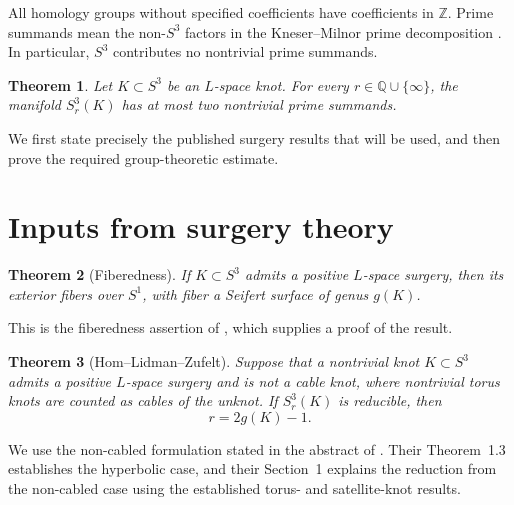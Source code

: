 \documentclass[11pt]{article}
\newcommand{\Z}{\mathbb{Z}}
\newcommand{\surg}[2]{S^3_{#1}(#2)}
\newtheorem{theorem}{Theorem}
\begin{document}
All homology groups without specified coefficients have coefficients
in \(\Z\). Prime summands mean the non-\(S^3\) factors in the
Kneser--Milnor prime decomposition
\cite[Theorem~1]{Milnor}. In particular, \(S^3\) contributes no
nontrivial prime summands.

\begin{theorem}\label{thm:main}
Let \(K\subset S^3\) be an \(L\)-space knot. For every
\(r\in\mathbb{Q}\cup\{\infty\}\), the manifold \(\surg{r}{K}\) has at most
two nontrivial prime summands.
\end{theorem}

We first state precisely the published surgery results that will be
used, and then prove the required group-theoretic estimate.

\section{Inputs from surgery theory}

\begin{theorem}[Fiberedness]\label{thm:fibered}
If \(K\subset S^3\) admits a positive \(L\)-space surgery, then its
exterior fibers over \(S^1\), with fiber a Seifert surface of genus
\(g(K)\).
\end{theorem}

This is the fiberedness assertion of
\cite[Theorem~1]{BaldwinSivek}, which supplies a proof of the result.


\begin{theorem}[Hom--Lidman--Zufelt]\label{thm:slope}
Suppose that a nontrivial knot \(K\subset S^3\) admits a positive
\(L\)-space surgery and is not a cable knot, where nontrivial torus
knots are counted as cables of the unknot. If \(\surg{r}{K}\) is
reducible, then
\[
    r=2g(K)-1.
\]
\end{theorem}


We use the non-cabled formulation stated in the abstract of
\cite{HLZ}. Their Theorem~1.3 establishes the hyperbolic case, and
their Section~1 explains the reduction from the non-cabled case using
the established torus- and satellite-knot results.
\end{document}
